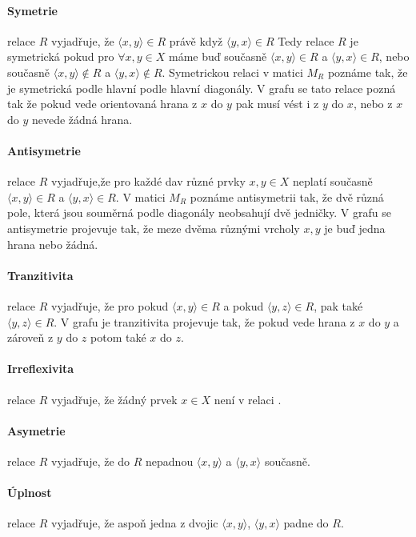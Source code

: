 \paragraph{Symetrie} relace $R$ vyjadřuje, že $\langle x, y \rangle \in R$ právě když  $\langle y, x \rangle \in R$ Tedy relace $R$ je symetrická pokud pro $\forall x,y \in X$ máme buď současně $\langle x, y \rangle \in R$ a  $\langle y, x \rangle \in R$, nebo současně  $\langle x, y \rangle \not\in R$ a  $\langle y, x \rangle \not\in R$. Symetrickou relaci v matici $M_R$ poznáme tak, že je symetrická podle hlavní podle hlavní diagonály. V grafu se tato relace pozná tak že pokud vede orientovaná hrana z $x$ do $y$ pak musí vést i z $y$ do $x$, nebo z $x$ do $y$ nevede žádná hrana.

\paragraph{Antisymetrie} relace $R$ vyjadřuje,že pro každé dav různé prvky $x,y \in X$ neplatí současně $\langle x, y \rangle \in R$ a  $\langle y, x \rangle \in R$. V matici $M_R$ poznáme antisymetrii tak, že dvě různá pole, která jsou souměrná podle diagonály neobsahují dvě jedničky. V grafu se antisymetrie projevuje tak, že meze dvěma různými vrcholy $x,y$ je buď jedna hrana nebo žádná.

\paragraph{Tranzitivita} relace $R$ vyjadřuje, že pro pokud $\langle x, y \rangle \in R$ a pokud $\langle y, z \rangle \in R$, pak také $\langle y, z \rangle \in R$. V grafu je tranzitivita projevuje tak, že pokud vede hrana z $x$ do $y$ a zároveň z $y$ do $z$ potom také $x$ do $z$.

\paragraph{Irreflexivita} relace $R$  vyjadřuje, že žádný prvek $x \in X$ není v relaci .
\paragraph{Asymetrie} relace $R$  vyjadřuje, že do $R$ nepadnou $\langle x, y \rangle$ a  $\langle y, x \rangle$ současně.
\paragraph{Úplnost} relace $R$  vyjadřuje, že aspoň jedna z dvojic $\langle x, y \rangle$, $\langle y, x \rangle$ padne do $R$.

